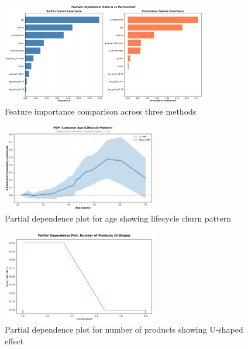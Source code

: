 \documentclass[12pt]{article}
\begin{document}
\begin{figure}[H]
\centering
\includegraphics[width=0.8\textwidth]{img/15_feature_importance_comparison.png}
\caption{Feature importance comparison across three methods}
\label{fig:feature_importance}
\end{figure}

\begin{figure}[H]
\centering
\includegraphics[width=0.6\textwidth]{img/18_pdp_age.png}
\caption{Partial dependence plot for age showing lifecycle churn pattern}
\label{fig:pdp_age}
\end{figure}

\begin{figure}[H]
\centering
\includegraphics[width=0.6\textwidth]{img/19_pdp_numofproducts.png}
\caption{Partial dependence plot for number of products showing U‑shaped effect}
\label{fig:pdp_products}
\end{figure}
\end{document}
